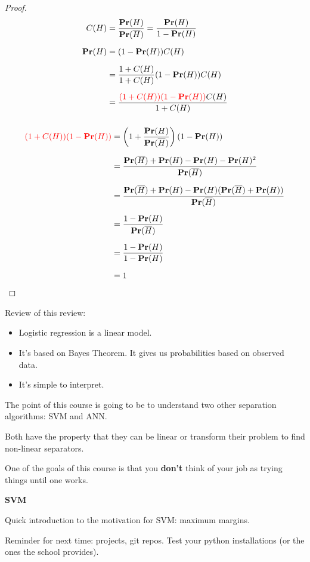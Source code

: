\begin{proof}
  \begin{align*}
    C(H) & = \frac{\mathbf{Pr}(H)}{\mathbf{Pr}(\overline{H})} =
           \frac{\mathbf{Pr}(H)}{1-\mathbf{Pr}(H)} \\[2mm]
    \mathbf{Pr}(H) & = (1-\mathbf{Pr}(H)) C(H)  \\[2mm]
         & = \frac{1+C(H)}{1+C(H)}(1-\mathbf{Pr}(H)) C(H) \\[2mm]
         & = \frac{\textcolor{red}{(1+C(H))(1-\mathbf{Pr}(H))} C(H)}{1+C(H)} \\[2mm]
  \end{align*}

  \begin{align*}
    \textcolor{red}{(1+C(H))(1-\mathbf{Pr}(H))} & = \left(1+\frac{\mathbf{Pr}(H)}{\mathbf{Pr}(\overline
                               H)}\right) \left(1-\mathbf{Pr}(H)\right) \\[2mm]
                             &= \frac{
                               \mathbf{Pr}(\overline H)
                               + \mathbf{Pr}(H)
                               - \mathbf{Pr}(H)
                               - \mathbf{Pr}(H)^2}
                               {\mathbf{Pr}(\overline H)} \\[2mm]
                             &= \frac{\mathbf{Pr}(\overline H) + \mathbf{Pr}(H) -
                               \mathbf{Pr}(H)(\mathbf{Pr}(\overline H) + \mathbf{Pr}(H))}
                               {\mathbf{Pr}(\overline H)} \\[2mm]
                             &= \frac{1-\mathbf{Pr}(H)}{\mathbf{Pr}(\overline H)} \\[2mm]
                             &= \frac{1-\mathbf{Pr}(H)}{1-\mathbf{Pr}(H)} \\[2mm]
                             &= 1
  \end{align*}
\end{proof}

\bigskip

Review of this review:
\begin{itemize}
\item Logistic regression is a linear model.
\item It's based on Bayes Theorem.  It gives us probabilities based on
  observed data.
\item It's simple to interpret.
\end{itemize}

The point of this course is going to be to understand two other
separation algorithms: SVM and ANN.

Both have the property that they can be linear or transform their
problem to find non-linear separators.

One of the goals of this course is that you \textbf{don't} think of your job as
trying things until one works.

\textbf{SVM}

Quick introduction to the motivation for SVM: maximum margins.

Reminder for next time: projects, git repos.  Test your python
installations (or the ones the school provides).



